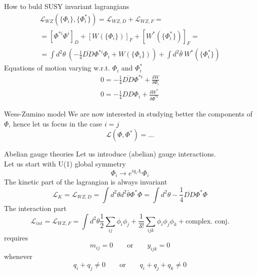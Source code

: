 \documentclass[10pt]{beamer}
\begin{document}
\begin{frame}{How to buld SUSY invariant lagrangians}
\begin{gather*}
\mathcal{L}_{WZ}\left(\{\Phi_i\}, \{\Phi^*_i\}\right) = \mathcal{L}_{WZ,D} + \mathcal{L}_{WZ,F} = \\
= \left[\Phi^{*i}\Phi^i\right]_D + \left[W(\{\Phi_i\})\right]_F +  \left[W^*(\{\Phi^*_i\})\right]_F = \\
= \boxed{\int d^2\theta \ \left(-\frac{1}{4}\overline{DD}\Phi^{*i}\Phi_i + W(\{\Phi_i\})\right) + \int d^2\bar\theta \ W^*(\{\Phi^*_i\})}
\end{gather*}
Equations of motion varying w.r.t. $\Phi_i$ and $\Phi_i^*$
\begin{gather*}
    0=-\frac{1}{4} \overline{D D} \Phi^{* i}+\frac{\delta W}{\delta \Phi_{i}} \\
    0=-\frac{1}{4} D D \Phi_{i}+\frac{\delta W^{*}}{\delta \Phi^{* i}}
\end{gather*}
\end{frame}

\begin{frame}{Wess-Zumino model}
    We are now interested in studying better the components of $\Phi$, hence let us focus in the case $i=j$
    \begin{equation*}
        \mathcal{L}(\Phi, \Phi^*) = \dots
    \end{equation*}
\end{frame}
    
\begin{frame}{Abelian gauge theories}
Let us introduce (abelian) gauge interactions. \\ 
Let us start with U(1) global symmetry 
\begin{equation*}
    \Phi_i \rightarrow e^{iq_i\Lambda_i}\Phi_i
\end{equation*}
The kinetic part of the lagrangian is always invariant
\begin{equation*}
    \mathcal{L}_{K} = \mathcal{L}_{WZ,D} = \int d^2\theta d^2 \bar\theta \Phi^*\Phi = \int d^2\theta -\frac{1}{4} \overline{D D} \Phi^*\Phi
\end{equation*}
The interaction part 
\begin{equation*}
    \mathcal{L}_{int} = \mathcal{L}_{WZ,F} = \int d^2\theta \frac{1}{2} \sum_{ij} \phi_i \phi_j + \frac{1}{3!} \sum_{ijk} \phi_i \phi_j \phi_k + \text{complex. conj.}
\end{equation*}
requires
\begin{equation*}
    m_{ij} = 0 \qquad \text{or} \qquad y_{ijk} = 0
\end{equation*}
whenever
\begin{equation*}
    q_i + q_j \neq 0 \qquad \text{or} \qquad q_i + q_j + q_k \neq 0
\end{equation*}
\end{frame}
\end{document}
